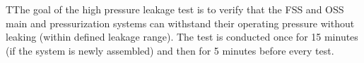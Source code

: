TThe goal of the high pressure leakage test is to verify that the FSS and OSS main and pressurization systems can withstand their operating pressure without leaking (within defined leakage range). The test is conducted once for 15 minutes (if the system is newly assembled) and then for 5 minutes before every test. 
